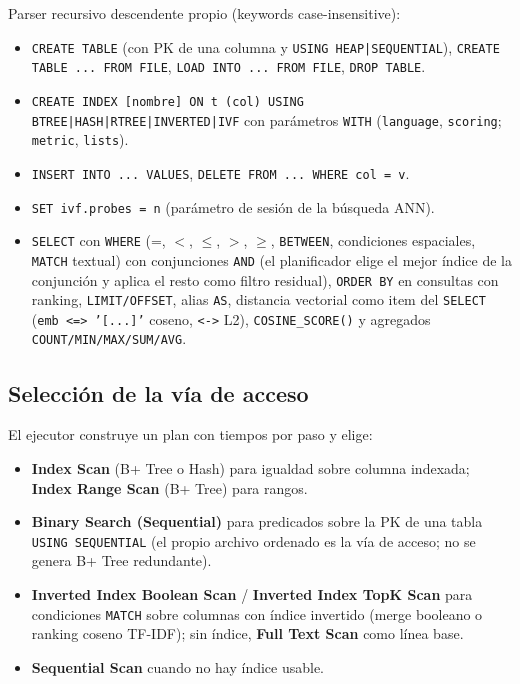 \documentclass[11pt]{article}
\begin{document}
Parser recursivo descendente propio (keywords case-insensitive):

\begin{itemize}
  \item \texttt{CREATE TABLE} (con PK de una columna y
        \texttt{USING HEAP|SEQUENTIAL}), \texttt{CREATE TABLE ... FROM FILE},
        \texttt{LOAD INTO ... FROM FILE}, \texttt{DROP TABLE}.
  \item \texttt{CREATE INDEX [nombre] ON t (col) USING
        BTREE|HASH|RTREE|INVERTED|IVF} con parámetros \texttt{WITH}
        (\texttt{language}, \texttt{scoring}; \texttt{metric},
        \texttt{lists}).
  \item \texttt{INSERT INTO ... VALUES}, \texttt{DELETE FROM ... WHERE col = v}.
  \item \texttt{SET ivf.probes = n} (parámetro de sesión de la búsqueda ANN).
  \item \texttt{SELECT} con \texttt{WHERE} (=, $<$, $\le$, $>$, $\ge$,
        \texttt{BETWEEN}, condiciones espaciales, \texttt{MATCH} textual)
        con conjunciones
        \texttt{AND} (el planificador elige el mejor índice de la
        conjunción y aplica el resto como filtro residual),
        \texttt{ORDER BY} en consultas con ranking,
        \texttt{LIMIT/OFFSET}, alias \texttt{AS}, distancia vectorial como
        item del \texttt{SELECT} (\texttt{emb \textless=\textgreater\ '[...]'}
        coseno, \texttt{\textless-\textgreater} L2), \texttt{COSINE\_SCORE()}
        y agregados \texttt{COUNT/MIN/MAX/SUM/AVG}.
\end{itemize}

\subsection{Selección de la vía de acceso}

El ejecutor construye un plan con tiempos por paso y elige:

\begin{itemize}
  \item \textbf{Index Scan} (B+ Tree o Hash) para igualdad sobre columna
        indexada; \textbf{Index Range Scan} (B+ Tree) para rangos.
  \item \textbf{Binary Search (Sequential)} para predicados sobre la PK de
        una tabla \texttt{USING SEQUENTIAL} (el propio archivo ordenado es
        la vía de acceso; no se genera B+ Tree redundante).
  \item \textbf{Inverted Index Boolean Scan} / \textbf{Inverted Index TopK
        Scan} para condiciones \texttt{MATCH} sobre columnas con índice
        invertido (merge booleano o ranking coseno TF-IDF); sin índice,
        \textbf{Full Text Scan} como línea base.
  \item \textbf{Sequential Scan} cuando no hay índice usable.
\end{itemize}
\end{document}
